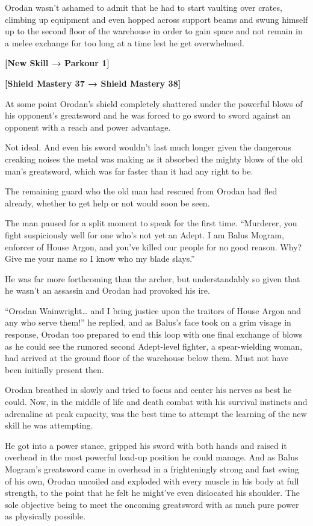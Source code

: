 \documentclass[a4paper,10pt]{book}
\begin{document}
Orodan wasn’t ashamed to admit that he had to start vaulting over crates, climbing up equipment and even hopped across support beams and swung himself up to the second floor of the warehouse in order to gain space and not remain in a melee exchange for too long at a time lest he get overwhelmed.\par
\textbf{[New Skill → Parkour 1]}\par
\textbf{[Shield Mastery 37 → Shield Mastery 38]}\par
At some point Orodan’s shield completely shattered under the powerful blows of his opponent’s greatsword and he was forced to go sword to sword against an opponent with a reach and power advantage.\par
Not ideal. And even his sword wouldn’t last much longer given the dangerous creaking noises the metal was making as it absorbed the mighty blows of the old man’s greatsword, which was far faster than it had any right to be.\par
The remaining guard who the old man had rescued from Orodan had fled already, whether to get help or not would soon be seen.\par
The man paused for a split moment to speak for the first time. “Murderer, you fight suspiciously well for one who’s not yet an Adept. I am Balus Mogram, enforcer of House Argon, and you’ve killed our people for no good reason. Why? Give me your name so I know who my blade slays.”\par
He was far more forthcoming than the archer, but understandably so given that he wasn’t an assassin and Orodan had provoked his ire.\par
“Orodan Wainwright… and I bring justice upon the traitors of House Argon and any who serve them!” he replied, and as Balus’s face took on a grim visage in response, Orodan too prepared to end this loop with one final exchange of blows as he could see the rumored second Adept-level fighter, a spear-wielding woman, had arrived at the ground floor of the warehouse below them. Must not have been initially present then.\par
Orodan breathed in slowly and tried to focus and center his nerves as best he could. Now, in the middle of life and death combat with his survival instincts and adrenaline at peak capacity, was the best time to attempt the learning of the new skill he was attempting.\par
He got into a power stance, gripped his sword with both hands and raised it overhead in the most powerful load-up position he could manage. And as Balus Mogram’s greatsword came in overhead in a frighteningly strong and fast swing of his own, Orodan uncoiled and exploded with every muscle in his body at full strength, to the point that he felt he might’ve even dislocated his shoulder. The sole objective being to meet the oncoming greatsword with as much pure power as physically possible.\par
\end{document}
